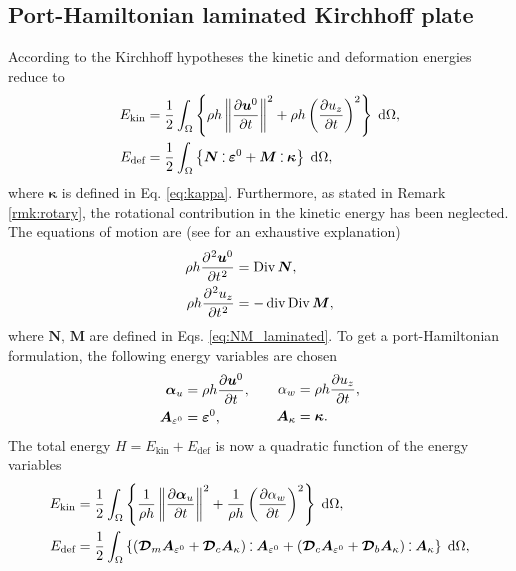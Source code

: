 \subsection{Port-Hamiltonian laminated Kirchhoff plate}
According to the Kirchhoff hypotheses the kinetic and deformation energies reduce to 
\begin{equation*}
\begin{aligned}
E_{\text{kin}} &= \energy{\rho h \norm{\diffp{\bm{u}^0}{t}}^2 + \rho h \left(\diffp{u_z}{t}\right)^2}, \\
E_{\text{def}} &= \energy{\bm{N} \cddot \bm{\varepsilon}^0 + \bm{M} \cddot \bm{\kappa}}, 
\end{aligned}
\end{equation*}
where $\bm{\kappa}$ is defined in Eq. \eqref{eq:kappa}. Furthermore, as stated in Remark \ref{rmk:rotary}, the rotational contribution in the kinetic energy has been neglected. The equations of motion are (see \cite[Chapter~3]{reddy2003mechanics} for an exhaustive explanation)
\begin{equation}\label{eq:sysLamKir}
\begin{aligned}
\rho h \diffp[2]{\bm{u}^0}{t} &= \Div \bm{N}, \\
\rho h \diffp[2]{{u}_z}{t} &= -\div\Div \bm{M}, 
\end{aligned}	
\end{equation}
where $\bm{N}, \, \bm{M}$ are defined in Eqs. \eqref{eq:NM_laminated}. 
To get a port-Hamiltonian formulation, the following energy variables are chosen
\begin{equation}
\begin{aligned}
\bm{\alpha}_u &= \rho h \diffp{\bm{u}^0}{t}, \\
\bm{A}_{\varepsilon^0} &= \bm{\varepsilon}^0,
\end{aligned} \qquad
\begin{aligned}
{\alpha}_w &= \rho h \diffp{{u}_z}{t}, \\
\bm{A}_{\kappa} &= \bm{\kappa}.
\end{aligned} 
\end{equation} 
The total energy $H=E_{\text{kin}} + E_{\text{def}}$ is now a quadratic function of the energy variables
\begin{equation*}
\begin{aligned}
E_{\text{kin}} &= \energy{\frac{1}{\rho h} \norm{\diffp{\bm{\alpha}_u}{t}}^2 + \frac{1}{\rho h} \left(\diffp{\alpha_w}{t}\right)^2}, \\
E_{\text{def}} &= \energy{(\bm{\mathcal{D}}_m \bm{A}_{\varepsilon^0} + \bm{\mathcal{D}}_c \bm{A}_{\kappa}) \cddot \bm{A}_{\varepsilon^0} + (\bm{\mathcal{D}}_c \bm{A}_{\varepsilon^0} + \bm{\mathcal{D}}_b \bm{A}_{\kappa}) \cddot \bm{A}_{\kappa}}, 
\end{aligned}
\end{equation*}
